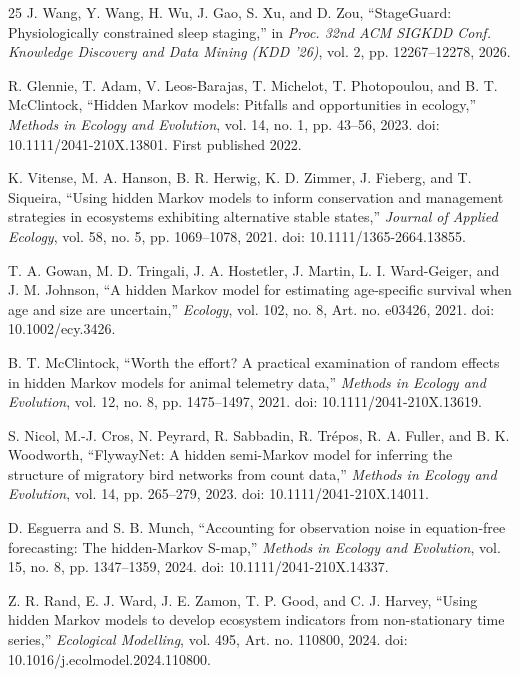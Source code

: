 \documentclass[11pt,letterpaper]{article}
\begin{document}
\begin{thebibliography}{25}
J. Wang, Y. Wang, H. Wu, J. Gao, S. Xu, and D. Zou, ``StageGuard: Physiologically constrained sleep staging,'' in \emph{Proc. 32nd ACM SIGKDD Conf. Knowledge Discovery and Data Mining (KDD '26)}, vol. 2, pp. 12267--12278, 2026.


R. Glennie, T. Adam, V. Leos-Barajas, T. Michelot, T. Photopoulou, and B. T. McClintock, ``Hidden Markov models: Pitfalls and opportunities in ecology,'' \emph{Methods in Ecology and Evolution}, vol. 14, no. 1, pp. 43--56, 2023. doi: 10.1111/2041-210X.13801. First published 2022.

K. Vitense, M. A. Hanson, B. R. Herwig, K. D. Zimmer, J. Fieberg, and T. Siqueira, ``Using hidden Markov models to inform conservation and management strategies in ecosystems exhibiting alternative stable states,'' \emph{Journal of Applied Ecology}, vol. 58, no. 5, pp. 1069--1078, 2021. doi: 10.1111/1365-2664.13855.

T. A. Gowan, M. D. Tringali, J. A. Hostetler, J. Martin, L. I. Ward-Geiger, and J. M. Johnson, ``A hidden Markov model for estimating age-specific survival when age and size are uncertain,'' \emph{Ecology}, vol. 102, no. 8, Art. no. e03426, 2021. doi: 10.1002/ecy.3426.

B. T. McClintock, ``Worth the effort? A practical examination of random effects in hidden Markov models for animal telemetry data,'' \emph{Methods in Ecology and Evolution}, vol. 12, no. 8, pp. 1475--1497, 2021. doi: 10.1111/2041-210X.13619.

S. Nicol, M.-J. Cros, N. Peyrard, R. Sabbadin, R. Tr\'epos, R. A. Fuller, and B. K. Woodworth, ``FlywayNet: A hidden semi-Markov model for inferring the structure of migratory bird networks from count data,'' \emph{Methods in Ecology and Evolution}, vol. 14, pp. 265--279, 2023. doi: 10.1111/2041-210X.14011.

D. Esguerra and S. B. Munch, ``Accounting for observation noise in equation-free forecasting: The hidden-Markov S-map,'' \emph{Methods in Ecology and Evolution}, vol. 15, no. 8, pp. 1347--1359, 2024. doi: 10.1111/2041-210X.14337.

Z. R. Rand, E. J. Ward, J. E. Zamon, T. P. Good, and C. J. Harvey, ``Using hidden Markov models to develop ecosystem indicators from non-stationary time series,'' \emph{Ecological Modelling}, vol. 495, Art. no. 110800, 2024. doi: 10.1016/j.ecolmodel.2024.110800.


\end{thebibliography}
\end{document}
